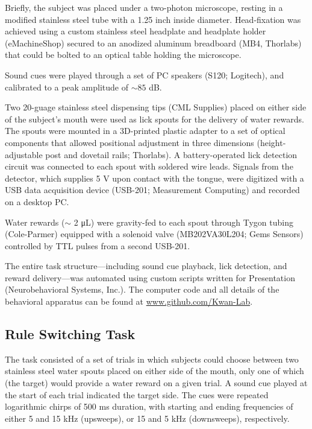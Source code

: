 Briefly, the subject was placed under a two-photon microscope, resting in a modified stainless steel tube with a 1.25 inch inside diameter. Head-fixation was achieved using a custom stainless steel headplate and headplate holder (eMachineShop) secured to an anodized aluminum breadboard (MB4, Thorlabs) that could be bolted to an optical table holding the microscope. 

Sound cues were played through a set of PC speakers (S120; Logitech), and calibrated to a peak amplitude of $\sim 85$ \si{\dB}. 

Two 20-guage stainless steel dispensing tips (CML Supplies) placed on either side of the subject's mouth were used as lick spouts for the delivery of water rewards. The spouts were mounted in a 3D-printed plastic adapter to a set of optical components that allowed positional adjustment in three dimensions (height-adjustable post and dovetail rails; Thorlabs). A battery-operated lick detection circuit
\citep{slotnick2009simple} was connected to each spout with soldered wire leads. Signals from the detector, which supplies 5 \si{\V} upon contact with the tongue, were digitized with a USB data acquisition device (USB-201; Measurement
Computing) and recorded on a desktop PC. 

Water rewards ($\sim$ 2 \si{\uL}) were gravity-fed to each spout through Tygon tubing (Cole-Parmer) equipped with a solenoid valve (MB202VA30L204; Gems Sensors) controlled by TTL pulses from a second USB-201. 

The entire task structure---including sound cue playback, lick detection, and reward delivery---was automated using custom scripts written for Presentation
(Neurobehavioral Systems, Inc.). The computer code and all details of the behavioral apparatus can be found at \url{www.github.com/Kwan-Lab}.

\subsection*{Rule Switching Task}

The task consisted of a set of trials in which subjects could choose between two stainless steel water spouts placed on either side of the mouth, only one of which (the target) would provide a water reward on a given trial. A sound cue played at the start of each trial indicated the target side. The cues were repeated logarithmic chirps of 500 ms duration, with starting and ending frequencies of either 5 and 15 kHz (upsweeps), or 15 and 5 kHz (downsweeps), respectively. 

